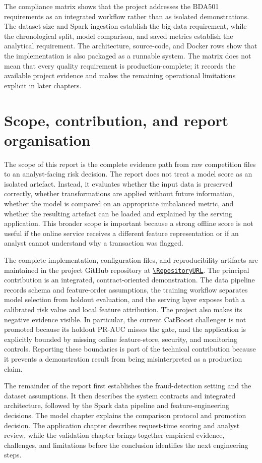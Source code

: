 The compliance matrix shows that the project addresses the BDA501 requirements
as an integrated workflow rather than as isolated demonstrations. The dataset
size and Spark ingestion establish the big-data requirement, while the
chronological split, model comparison, and saved metrics establish the
analytical requirement. The architecture, source-code, and Docker rows show
that the implementation is also packaged as a runnable system. The matrix does
not mean that every quality requirement is production-complete; it records the
available project evidence and makes the remaining operational limitations
explicit in later chapters.

\section{Scope, contribution, and report organisation}

The scope of this report is the complete evidence path from raw competition
files to an analyst-facing risk decision. The report does not treat a model
score as an isolated artefact. Instead, it evaluates whether the input data is
preserved correctly, whether transformations are applied without future
information, whether the model is compared on an appropriate imbalanced metric,
and whether the resulting artefact can be loaded and explained by the serving
application. This broader scope is important because a strong offline score is
not useful if the online service receives a different feature representation or
if an analyst cannot understand why a transaction was flagged.

The complete implementation, configuration files, and reproducibility
artifacts are maintained in the project GitHub repository at
\href{\RepositoryURL}{\nolinkurl{\RepositoryURL}}. The principal contribution is an integrated, contract-oriented demonstration.
The data pipeline records schema and feature-order assumptions, the training
workflow separates model selection from holdout evaluation, and the serving
layer exposes both a calibrated risk value and local feature attribution. The
project also makes its negative evidence visible. In particular, the current
CatBoost challenger is not promoted because its holdout PR-AUC misses the gate,
and the application is explicitly bounded by missing online feature-store,
security, and monitoring controls. Reporting these boundaries is part of the
technical contribution because it prevents a demonstration result from being
misinterpreted as a production claim.

The remainder of the report first establishes the fraud-detection setting and
the dataset assumptions. It then describes the system contracts and integrated
architecture, followed by the Spark data pipeline and feature-engineering
decisions. The model chapter explains the comparison protocol and promotion
decision. The application chapter describes request-time scoring and analyst
review, while the validation chapter brings together empirical evidence,
challenges, and limitations before the conclusion identifies the next
engineering steps.
